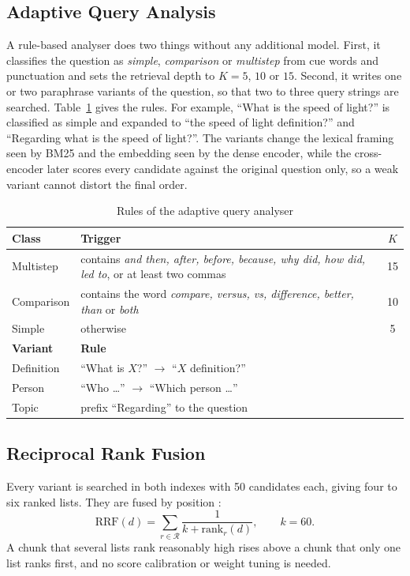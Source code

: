 \documentclass[conference]{IEEEtran}
\begin{document}
\subsection{Adaptive Query Analysis}
A rule-based analyser does two things without any additional model. First, it classifies the
question as \emph{simple}, \emph{comparison} or \emph{multistep} from cue words and punctuation
and sets the retrieval depth to $K=5$, $10$ or $15$. Second, it writes one or two paraphrase
variants of the question, so that two to three query strings are searched. Table~\ref{tab:rules}
gives the rules. For example, ``What is the speed of light?'' is classified as simple and
expanded to ``the speed of light definition?'' and ``Regarding what is the speed of light?''.
The variants change the lexical framing seen by BM25 and the embedding seen by the dense
encoder, while the cross-encoder later scores every candidate against the original question
only, so a weak variant cannot distort the final order.

\begin{table}[t]
\centering
\caption{Rules of the adaptive query analyser}
\label{tab:rules}
\footnotesize
\begin{tabular}{@{}p{}p{}c@{}}
\toprule
\textbf{Class} & \textbf{Trigger} & $K$ \\
\midrule
Multistep & contains \emph{and then, after, before, because, why did, how did, led to}, or at least two commas & 15 \\
Comparison & contains the word \emph{compare, versus, vs, difference, better, than} or \emph{both} & 10 \\
Simple & otherwise & 5 \\
\midrule
\textbf{Variant} & \textbf{Rule} & \\
\midrule
Definition & ``What is $X$?'' $\rightarrow$ ``$X$ definition?'' & \\
Person & ``Who \ldots'' $\rightarrow$ ``Which person \ldots'' & \\
Topic & prefix ``Regarding'' to the question & \\
\bottomrule
\end{tabular}
\end{table}

\subsection{Reciprocal Rank Fusion}
Every variant is searched in both indexes with 50 candidates each, giving four to six ranked
lists. They are fused by position \cite{cormack2009}:
\begin{equation}
\mathrm{RRF}(d)=\sum_{r\in\mathcal{R}}\frac{1}{k+\mathrm{rank}_r(d)},\qquad k=60 .
\end{equation}
A chunk that several lists rank reasonably high rises above a chunk that only one list ranks
first, and no score calibration or weight tuning is needed.
\end{document}
